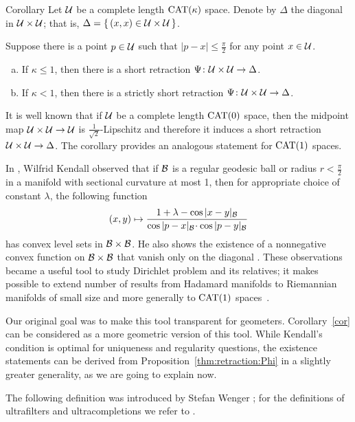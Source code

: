 \documentclass[oneside,a4paper, 12pt]{article}
\begin{document}
\begin{thm}{Corollary}\label{cor}
Let $\mathcal{U}$ be a complete length $\mathrm{CAT}(\kappa)$ space.
Denote by $\Delta$ the diagonal in $\mathcal{U}\times \mathcal{U}$;
that is, $\Delta=\{\,(x,x)\in \mathcal{U}\times \mathcal{U}\,\}$.

Suppose there is a point $p\in \mathcal{U}$ such that $|p-x|\le \tfrac\pi2$ for any point $x\in \mathcal{U}$.
\begin{enumerate}[(a)]
\item
If $\kappa\le 1$, then there is a short retraction $\Psi\colon\mathcal{U}\times \mathcal{U}\to \Delta$.
\item If $\kappa<1$, then there is a strictly short retraction $\Psi\colon\mathcal{U}\times \mathcal{U}\to \Delta$.
\end{enumerate}

\end{thm}

It is well known that if $\mathcal{U}$ be a complete length $\mathrm{CAT}(0)$ space, then the midpoint map $\mathcal{U}\times \mathcal{U}\to \mathcal{U}$ is $\tfrac1{\sqrt{2}}$-Lipschitz and therefore it induces a short retraction $\mathcal{U}\times \mathcal{U}\to\Delta$. 
The corollary provides an analogous statement for $\mathrm{CAT}(1)$ spaces.


In \cite[(4.1)]{kendall}, Wilfrid Kendall observed that if $\mathcal{B}$ is a regular geodesic ball or radius $r<\tfrac\pi2$ in a manifold with sectional curvature at most 1, then for appropriate choice of constant $\lambda$, the following function
\[(x,y)\mapsto 
\frac{1+\lambda-\cos|x-y|_{\spc{B}}}{\cos|p-x|_{\spc{B}}\cdot \cos|p-y|_{\spc{B}}}
\]
has convex level sets in ${\mathcal{B}}\times {\mathcal{B}}$.
He also shows the existence of a nonnegative convex function on ${\mathcal{B}}\times {\mathcal{B}}$ that vanish only on the diagonal \cite[(4.2)]{kendall}.
These observations became a useful tool to study Dirichlet problem and its relatives;
it makes possible to extend number of results from Hadamard manifolds to Riemannian manifolds of small size
and more generally to $\mathrm{CAT}(1)$ spaces~\cite{yokota,BFHMSZ,fuglede,serbinowski}. 

Our original goal was to make this tool transparent for geometers.
Corollary~\ref{cor} can be considered as a more geometric version of this tool.
While Kendall's condition is optimal for uniqueness and regularity questions, the existence statements can be derived from  Proposition~\ref{thm:retraction:Phi} in a
slightly greater generality, as  we are going to explain now.

The following definition was introduced by Stefan Wenger \cite{Wenger-1comp};
for the definitions of ultrafilters and ultracompletions we refer to \cite{Wenger-1comp,guo-wenger,akp}.
\end{document}
